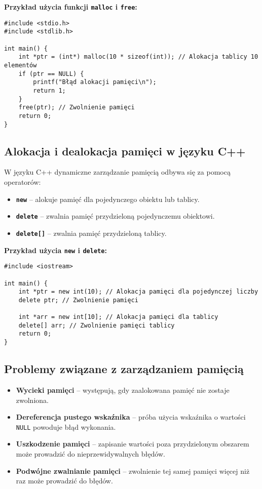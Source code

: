 \textbf{Przykład użycia funkcji \texttt{malloc} i \texttt{free}:}

\begin{verbatim}
#include <stdio.h>
#include <stdlib.h>

int main() {
    int *ptr = (int*) malloc(10 * sizeof(int)); // Alokacja tablicy 10 elementów
    if (ptr == NULL) {
        printf("Błąd alokacji pamięci\n");
        return 1;
    }
    free(ptr); // Zwolnienie pamięci
    return 0;
}
\end{verbatim}

\subsection{Alokacja i dealokacja pamięci w języku C++}
W języku C++ dynamiczne zarządzanie pamięcią odbywa się za pomocą operatorów:

\begin{itemize}
    \item \textbf{\texttt{new}} – alokuje pamięć dla pojedynczego obiektu lub tablicy.
    \item \textbf{\texttt{delete}} – zwalnia pamięć przydzieloną pojedynczemu obiektowi.
    \item \textbf{\texttt{delete[]}} – zwalnia pamięć przydzieloną tablicy.
\end{itemize}

\textbf{Przykład użycia \texttt{new} i \texttt{delete}:}

\begin{verbatim}
#include <iostream>

int main() {
    int *ptr = new int(10); // Alokacja pamięci dla pojedynczej liczby
    delete ptr; // Zwolnienie pamięci

    int *arr = new int[10]; // Alokacja pamięci dla tablicy
    delete[] arr; // Zwolnienie pamięci tablicy
    return 0;
}
\end{verbatim}

\subsection{Problemy związane z zarządzaniem pamięcią}
\begin{itemize}
    \item \textbf{Wycieki pamięci} – występują, gdy zaalokowana pamięć nie zostaje zwolniona.
    \item \textbf{Dereferencja pustego wskaźnika} – próba użycia wskaźnika o wartości \texttt{NULL} powoduje błąd wykonania.
    \item \textbf{Uszkodzenie pamięci} – zapisanie wartości poza przydzielonym obszarem może prowadzić do nieprzewidywalnych błędów.
    \item \textbf{Podwójne zwalnianie pamięci} – zwolnienie tej samej pamięci więcej niż raz może prowadzić do błędów.
\end{itemize}

